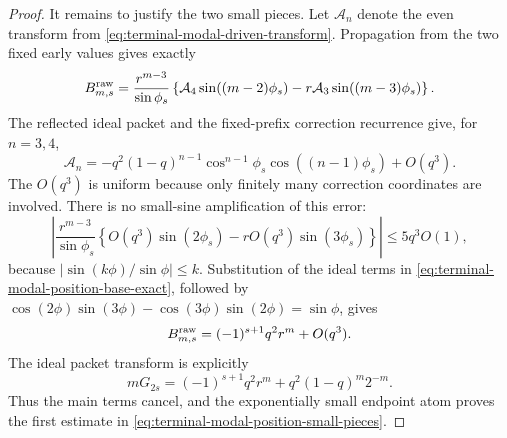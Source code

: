 \begin{proof}
It remains to justify the two small pieces.  Let $\mathcal A_n$ denote the
even transform from \eqref{eq:terminal-modal-driven-transform}.  Propagation
from the two fixed early values gives exactly
\begin{equation}
 B^{\rm raw}_{m,s}
 =\frac{r^{m-3}}{\sin\phi_s}
 \left\{\mathcal A_4\sin((m-2)\phi_s)
 -r\mathcal A_3\sin((m-3)\phi_s)\right\}.
 \label{eq:terminal-modal-position-base-exact}
\end{equation}
The reflected ideal packet and the fixed-prefix correction recurrence give,
for $n=3,4$,
\begin{equation}
 \mathcal A_n=-q^2(1-q)^{n-1}\cos^{n-1}\phi_s
 \cos((n-1)\phi_s)+O(q^3).
 \label{eq:terminal-modal-position-base-data}
\end{equation}
The $O(q^3)$ is uniform because only finitely many correction coordinates are
involved.  There is no small-sine amplification of this error:
\begin{equation}
 \left|\frac{r^{m-3}}{\sin\phi_s}
 \left\{O(q^3)\sin(2\phi_s)-rO(q^3)\sin(3\phi_s)\right\}\right|
 \le 5q^3O(1),
 \label{eq:terminal-modal-position-base-error}
\end{equation}
because $|\sin(k\phi)/\sin\phi|\le k$.  Substitution of the ideal terms in
\eqref{eq:terminal-modal-position-base-exact}, followed by
$\cos(2\phi)\sin(3\phi)-\cos(3\phi)\sin(2\phi)=\sin\phi$, gives
\begin{equation}
 B^{\rm raw}_{m,s}=(-1)^{s+1}q^2r^m+O(q^3).
 \label{eq:terminal-modal-position-base-match}
\end{equation}
The ideal packet transform is explicitly
\begin{equation}
 mG_{2s}=(-1)^{s+1}q^2r^m+q^2(1-q)^m2^{-m}.
 \label{eq:terminal-modal-position-ideal-transform}
\end{equation}
Thus the main terms cancel, and the exponentially small endpoint atom proves
the first estimate in \eqref{eq:terminal-modal-position-small-pieces}.


\end{proof}
